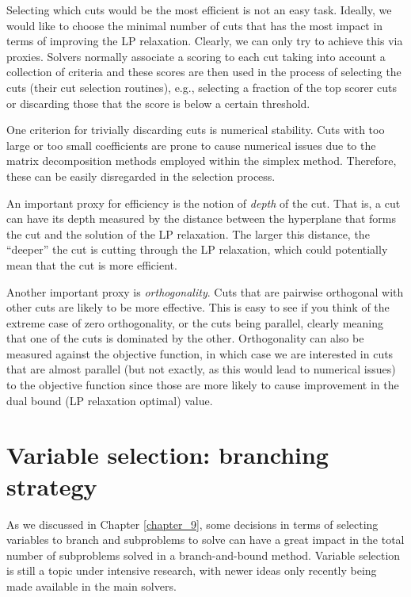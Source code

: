 Selecting which cuts would be the most efficient is not an easy task. Ideally, we would like to choose the minimal number of cuts that has the most impact in terms of improving the LP relaxation. Clearly, we can only try to achieve this via proxies. Solvers normally associate a scoring to each cut taking into account a collection of criteria and these scores are then used in the process of selecting the cuts (their cut selection routines), e.g., selecting a fraction of the top scorer cuts or discarding those that the score is below a certain threshold.

One criterion for trivially discarding cuts is numerical stability. Cuts with too large or too small coefficients are prone to cause numerical issues due to the matrix decomposition methods employed within the simplex method. Therefore, these can be easily disregarded in the selection process. 

An important proxy for efficiency is the notion of \emph{depth} of the cut. That is, a cut can have its depth measured by the distance between the hyperplane that forms the cut and the solution of the LP relaxation. The larger this distance, the ``deeper'' the cut is cutting through the LP relaxation, which could potentially mean that the cut is more efficient. 

Another important proxy is \emph{orthogonality}. Cuts that are pairwise orthogonal with other cuts are likely to be more effective. This is easy to see if you think of the extreme case of zero orthogonality, or the cuts being parallel, clearly meaning that one of the cuts is dominated by the other. Orthogonality can also be measured against the objective function, in which case we are interested in cuts that are almost parallel (but not exactly, as this would lead to numerical issues) to the objective function since those are more likely to cause improvement in the dual bound (LP relaxation optimal) value.


\section{Variable selection: branching strategy}

As we discussed in Chapter \ref{chapter_9}, some decisions in terms of selecting variables to branch and subproblems to solve can have a great impact in the total number of subproblems solved in a branch-and-bound method. Variable selection is still a topic under intensive research, with newer ideas only recently being made available in the main solvers. 

